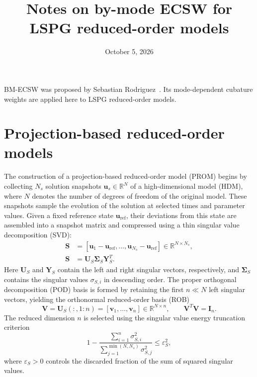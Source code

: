 \documentclass[a4paper,12pt]{article}
\title{Notes on by-mode ECSW for LSPG reduced-order models}
\author{}
\date{October 5, 2026}
\newcommand{\vect}[1]{\boldsymbol{#1}}
\newcommand{\matr}[1]{\boldsymbol{#1}}
\begin{document}
\maketitle

BM-ECSW was proposed by Sebastian Rodriguez~\cite{rodriguez2026proposal}. Its mode-dependent cubature weights are applied here to LSPG reduced-order models.

\section{Projection-based reduced-order models}
\label{sec:prom}

The construction of a projection-based reduced-order model (PROM) begins by collecting $N_s$ solution snapshots $\vect{u}_s\in\mathbb R^N$ of a high-dimensional model (HDM), where $N$ denotes the number of degrees of freedom of the original model. These snapshots sample the evolution of the solution at selected times and parameter values. Given a fixed reference state $\vect{u}_{\mathrm{ref}}$, their deviations from this state are assembled into a snapshot matrix and compressed using a thin singular value decomposition (SVD):
\begin{equation}
 \begin{aligned}
 \matr{S}
 &=[\vect{u}_1-\vect{u}_{\mathrm{ref}},\ldots,
     \vect{u}_{N_s}-\vect{u}_{\mathrm{ref}}]
     \in\mathbb R^{N\times N_s},\\
 \matr{S}&=\matr{U}_S\matr{\Sigma}_S\matr{Y}_S^T.
 \end{aligned}
 \label{eq:pod-snapshots}
\end{equation}
Here $\matr{U}_S$ and $\matr{Y}_S$ contain the left and right singular vectors, respectively, and $\matr{\Sigma}_S$ contains the singular values $\sigma_{S,i}$ in descending order. The proper orthogonal decomposition (POD) basis is formed by retaining the first $n\ll N$ left singular vectors, yielding the orthonormal reduced-order basis (ROB)
\begin{equation}
 \matr{V}=\matr{U}_S(:,1:n)
         =[\vect{v}_1,\ldots,\vect{v}_n]
         \in\mathbb R^{N\times n},
 \qquad \matr{V}^T\matr{V}=\matr{I}_n.
 \label{eq:pod-basis}
\end{equation}
The reduced dimension $n$ is selected using the singular value energy truncation criterion
\begin{equation}
 1-\frac{\displaystyle\sum_{i=1}^{n}\sigma_{S,i}^2}
         {\displaystyle\sum_{j=1}^{\min(N,N_s)}\sigma_{S,j}^2}
 \leq\varepsilon_S^2,
 \label{eq:pod-tolerance}
\end{equation}
where $\varepsilon_S>0$ controls the discarded fraction of the sum of squared singular values.
\end{document}
